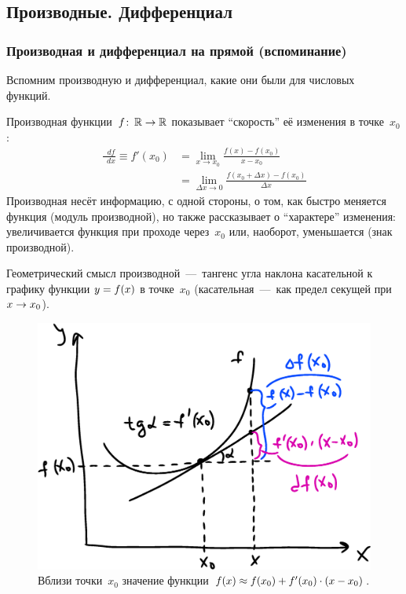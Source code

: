 \documentclass[a4paper,12pt]{article}
\newcommand{\diff}{\mathop{}\!d}
\begin{document}
  \subsection{Производные. Дифференциал}


  \subsubsection{Производная и дифференциал на прямой (вспоминание)}  %

  Вспомним производную и дифференциал, какие они были для числовых функций.

  Производная функции~$f\colon \RR \hm\to \RR$ показывает ``скорость'' её изменения в точке~$x_0$:
  \begin{equation}\label{eq:derivative-in-R}
  \begin{split}
    \frac{\diff f}{\diff x} \equiv f'(x_0)
      &= \lim_{x \to x_0} \frac{f(x) - f(x_0)}{x - x_0}\\
      &= \lim_{\Delta x \to 0} \frac{f(x_0 + \Delta x) - f(x_0)}{\Delta x}
  \end{split}
  \end{equation}
  Производная несёт информацию, с одной стороны, о том, как быстро меняется функция (модуль производной), но также рассказывает о ``характере'' изменения: увеличивается функция при проходе через~$x_0$ или, наоборот, уменьшается (знак производной).

  Геометрический смысл производной~---~тангенс угла наклона касательной к графику функции $y \hm= f(x)$ в точке~$x_0$ (касательная~---~как предел секущей при $x \hm\to x_0$).

  \begin{figure}[ht]
    \centering
      
    \includegraphics[width=0.6\linewidth]{images/diff-f-df}
      
    \caption{Вблизи точки~$x_0$ значение функции $f(x) \hm\approx f(x_0) \hm+ f'(x_0) \cdot (x - x_0)$.}
    \label{fig:diff-f}
  \end{figure}
\end{document}
